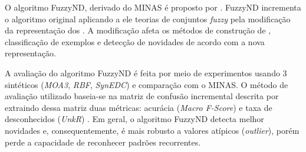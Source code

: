 
O algoritmo FuzzyND, derivado do MINAS é proposto por .
FuzzyND incrementa o algoritmo original aplicando a ele teorias de
conjuntos \emph{fuzzy} pela modificação da representação dos \clusters.
A modificação afeta os métodos de construção de \clusters, classificação
de exemplos e detecção de novidades de acordo com a nova representação.


A avaliação do algoritmo FuzzyND é feita por meio de experimentos usando 3 
\datasets sintéticos (\emph{MOA3}, \emph{RBF}, \emph{SynEDC})
e comparação com o MINAS.
O método de avaliação utilizado baseia-se na matriz de confusão incremental
descrita por  extraindo dessa matriz duas métricas:
acurácia (\emph{Macro F-Score}) \cite{Sokolova2009} e
taxa de desconhecidos (\emph{UnkR}) \cite{Faria2016minas}.
Em geral, o algoritmo FuzzyND detecta melhor novidades e, consequentemente,
é mais robusto a valores atípicos (\emph{outlier}), porém perde a capacidade
de reconhecer padrões recorrentes.



